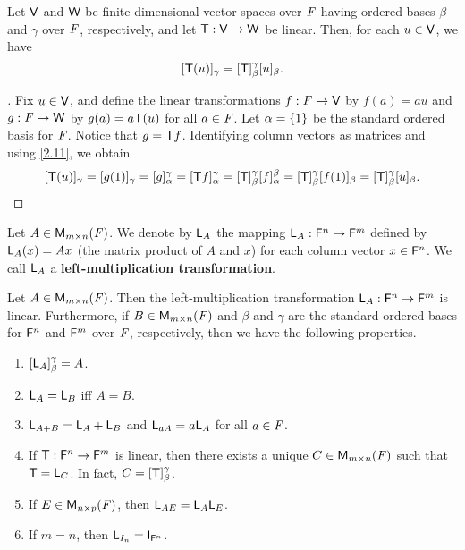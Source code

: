 \begin{thm}\label{2.14}
  Let \(\mathsf{V}\) and \(\mathsf{W}\) be finite-dimensional vector spaces over \(\mathit{F}\) having ordered bases \(\beta\) and \(\gamma\) over \(\mathit{F}\), respectively, and let \(\mathsf{T} : \mathsf{V} \to \mathsf{W}\) be linear.
  Then, for each \(u \in \mathsf{V}\), we have
  \[
    [\mathsf{T}(u)]_{\gamma} = [\mathsf{T}]_{\beta}^{\gamma} [u]_{\beta}.
  \]
\end{thm}

\begin{proof}[]
  Fix \(u \in \mathsf{V}\), and define the linear transformations \(f : \mathit{F} \to \mathsf{V}\) by \(f(a) = au\) and \(g : \mathit{F} \to \mathsf{W}\) by \(g(a) = a \mathsf{T}(u)\) for all \(a \in \mathit{F}\).
  Let \(\alpha = \left\lbrace1\right\rbrace\) be the standard ordered basis for \(\mathit{F}\).
  Notice that \(g = \mathsf{T} f\).
  Identifying column vectors as matrices and using \cref{2.11}, we obtain
  \[
    [\mathsf{T}(u)]_{\gamma} = [g(1)]_{\gamma} = [g]_{\alpha}^{\gamma} = [\mathsf{T} f]_{\alpha}^{\gamma} = [\mathsf{T}]_{\beta}^{\gamma} [f]_{\alpha}^{\beta} = [\mathsf{T}]_{\beta}^{\gamma} [f(1)]_{\beta} = [\mathsf{T}]_{\beta}^{\gamma} [u]_{\beta}.
  \]
\end{proof}

\begin{defn}\label{2.3.8}
  Let \(A \in \mathsf{M}_{{m} \times n}({\mathit{F}})\).
  We denote by \(\mathsf{L}_A\) the mapping \(\mathsf{L}_A : \mathsf{F}^n \to \mathsf{F}^m\) defined by \(\mathsf{L}_A(x) = Ax\) (the matrix product of \(A\) and \(x\)) for each column vector \(x \in \mathsf{F}^n\).
  We call \(\mathsf{L}_A\) a \textbf{left-multiplication transformation}.
\end{defn}

\begin{thm}\label{2.15}
  Let \(A \in \mathsf{M}_{{m} \times n}({\mathit{F}})\).
  Then the left-multiplication transformation \(\mathsf{L}_A : \mathsf{F}^n \to \mathsf{F}^m\) is linear.
  Furthermore, if \(B \in \mathsf{M}_{{m} \times n}({\mathit{F}})\) and \(\beta\) and \(\gamma\) are the standard ordered bases for \(\mathsf{F}^n\) and \(\mathsf{F}^m\) over \(\mathit{F}\), respectively, then we have the following properties.
  \begin{enumerate}
    \item \([\mathsf{L}_A]_{\beta}^{\gamma} = A\).
    \item \(\mathsf{L}_A = \mathsf{L}_B\) iff \(A = B\).
    \item \(\mathsf{L}_{A + B} = \mathsf{L}_A + \mathsf{L}_B\) and \(\mathsf{L}_{aA} = a \mathsf{L}_A\) for all \(a \in \mathit{F}\).
    \item If \(\mathsf{T} : \mathsf{F}^n \to \mathsf{F}^m\) is linear, then there exists a unique \(C \in \mathsf{M}_{{m} \times n}({\mathit{F}})\) such that \(\mathsf{T} = \mathsf{L}_C\).
          In fact, \(C = [\mathsf{T}]_{\beta}^{\gamma}\).
    \item If \(E \in \mathsf{M}_{{n} \times p}({\mathit{F}})\), then \(\mathsf{L}_{AE} = \mathsf{L}_A \mathsf{L}_E\).
    \item If \(m = n\), then \(\L_{I_n} = \IT[\vs{F}^n]\).
  \end{enumerate}
\end{thm}


